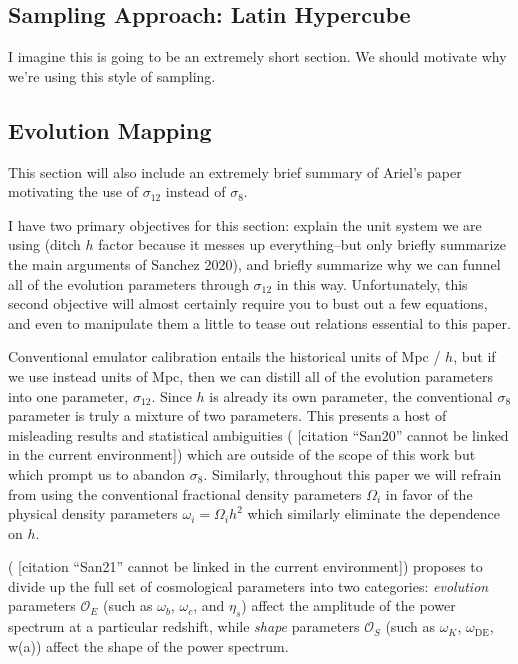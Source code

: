 \documentclass[11pt]{article}
\newcommand{\cbib}[1]
{\IfFileExists{biblatex.sty}
{\cite{#1}}
{[citation ``#1'' cannot be linked in the current environment]}}
\begin{document}
\begin{centering}
\subsection{Sampling Approach: Latin Hypercube}
\end{centering}

I imagine this is going to be an extremely short section. We should motivate why we're using this style of sampling.

\begin{centering}
\subsection{Evolution Mapping}
\end{centering}

This section will also include an extremely brief summary of Ariel's paper motivating the use of $\sigma_{12}$ instead of $\sigma_8$.

    I have two primary objectives for this section: explain the unit system
    we are using (ditch $h$ factor because it messes up everything--but
    only briefly summarize the main arguments of Sanchez 2020), and briefly
    summarize why we can funnel all of the evolution parameters through
    $\sigma_{12}$ in this way. Unfortunately, this second objective will
    almost certainly require you to bust out a few equations, and even to
    manipulate them a little to tease out relations essential to this paper.

Conventional emulator calibration entails the historical units of Mpc / $h$,
but if we use instead units of Mpc, then we can distill all of the evolution
parameters into one parameter, $\sigma_{12}$. Since $h$ is already its own parameter, the conventional $\sigma_8$ parameter is truly a mixture
of two parameters. This presents a host of misleading results  and statistical
ambiguities (\cbib{San20}) which are outside of the scope of this work but
which prompt us to abandon $\sigma_8$.
Similarly, throughout this paper we will refrain from using the conventional
fractional density parameters $\Omega_i$ in favor of the physical density
parameters $\omega_i = \Omega_i h^2$ which similarly eliminate the
dependence on $h$.

(\cbib{San21}) proposes to divide up the full set of cosmological
parameters into two categories: \textit{evolution} parameters $\mathcal{O}_E$
(such as $\omega_b$, $\omega_c$, and $\eta_s$)
affect the amplitude of the power spectrum at a particular redshift, while
\textit{shape} parameters $\mathcal{O}_S$
(such as $\omega_K$, $\omega_\text{DE}$, w(a))
affect the shape of the power
spectrum.
\end{document}
